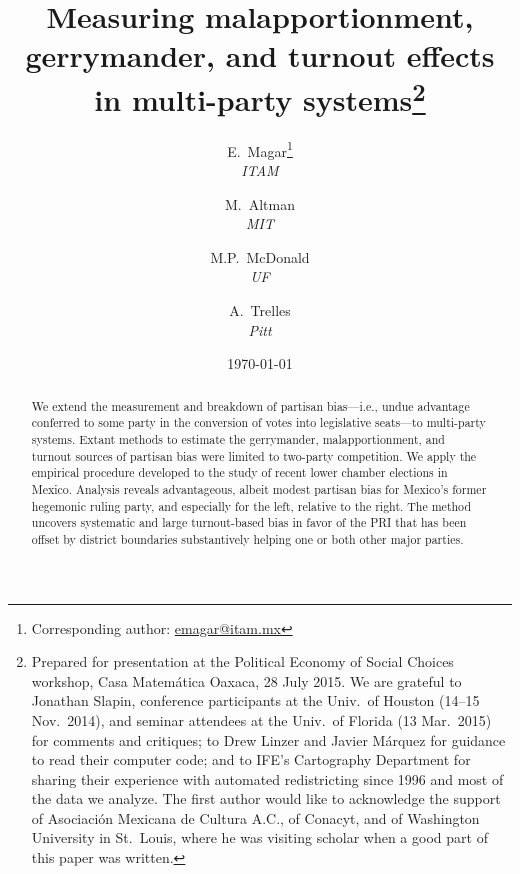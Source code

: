 \documentclass[letter,12pt]{article}
\begin{document}
\title{Measuring malapportionment, gerrymander, and turnout effects in multi-party systems\thanks{Prepared for presentation at the Political Economy of Social Choices workshop, Casa Matem\'atica Oaxaca, 28 July 2015. We are grateful to Jonathan Slapin, conference participants at the Univ.\ of Houston (14--15 Nov.\ 2014), and seminar attendees at the Univ.\ of Florida (13 Mar.\ 2015) for comments and critiques; to Drew Linzer and Javier M\'arquez for guidance to read their computer code; and to IFE's Cartography Department for sharing their experience with automated redistricting since 1996 and most of the data we analyze. The first author would like to acknowledge the support of Asociaci\'on Mexicana de Cultura A.C., of Conacyt, and of Washington University in St.\ Louis, where he was visiting scholar when a good part of this paper was written.}}
\author{E.~Magar\footnote{Corresponding author: \url{emagar@itam.mx}} \\ \emph{ITAM} \and
        M.~Altman \\ \emph{MIT} \and
        M.P.~McDonald \\ \emph{UF} \and  
        A.~Trelles \\ \emph{Pitt}
      }
\date{\today}
\maketitle





\begin{abstract}
\noindent We extend the measurement and breakdown of partisan bias---i.e., undue advantage conferred to some party in the conversion of votes into legislative seats---to multi-party systems. Extant methods to estimate the gerrymander, malapportionment, and turnout sources of partisan bias were limited to two-party competition. We apply the empirical procedure developed to the study of recent lower chamber elections in Mexico. Analysis reveals advantageous, albeit modest partisan bias for Mexico's former hegemonic ruling party, and especially for the left, relative to the right. The method uncovers systematic and large turnout-based bias in favor of the PRI that has been offset by district boundaries substantively helping one or both other major parties.
\end{abstract}
\end{document}
